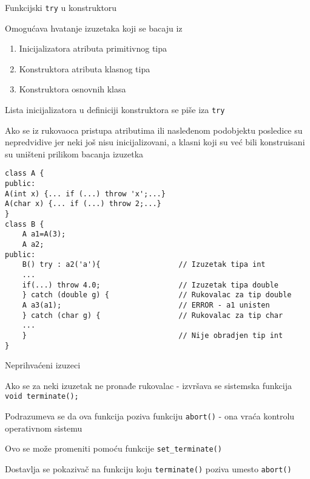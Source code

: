 \documentclass{article}
\newenvironment{xitemize}{%
    
    \itemize
    \larger
}{%
    \enditemize
}
\let\olditemize\itemize
\let\endolditemize\enditemize
\renewenvironment{itemize}{%
    \smaller
    \olditemize
}{%
    \endolditemize
}
\providecommand{\inlinecode}[1]{\texttt{#1}}
\begin{document}
\begin{xitemize}
\begin{itemize}
\begin{lstlisting}
    \end{lstlisting}
\end{itemize}
\item Funkcijski \inlinecode{try} u konstruktoru
\begin{itemize}
    \item Omogućava hvatanje izuzetaka koji se bacaju iz
    \begin{enumerate}
        \item Inicijalizatora atributa primitivnog tipa
        \item Konstruktora atributa klasnog tipa
        \item Konstruktora osnovnih klasa
    \end{enumerate}
    \item Lista inicijalizatora u definiciji konstruktora se piše iza \inlinecode{try}
    \item Ako se iz rukovaoca pristupa atributima ili nasleđenom podobjektu posledice su nepredvidive jer neki još nisu inicijalizovani, a klasni koji su već bili konstruisani su uništeni prilikom bacanja izuzetka
    \begin{lstlisting}
class A {
public:
A(int x) {... if (...) throw 'x';...}
A(char x) {... if (...) throw 2;...}
}
class B {
    A a1=A(3);
    A a2;
public:
    B() try : a2('a'){                  // Izuzetak tipa int
    ... 
    if(...) throw 4.0;                  // Izuzetak tipa double
    } catch (double g) {                // Rukovalac za tip double
    A a3(a1);                           // ERROR - a1 unisten
    } catch (char g) {                  // Rukovalac za tip char
    ...
    }                                   // Nije obradjen tip int
}
    \end{lstlisting}
\end{itemize}
\item Neprihvaćeni izuzeci
\begin{itemize}
    \item Ako se za neki izuzetak ne pronađe rukovalac - izvršava se sistemska funkcija \\
    \inlinecode{void terminate();}
    \item Podrazumeva se da ova funkcija poziva funkciju \inlinecode{abort()} - ona vraća kontrolu operativnom sistemu
    \item Ovo se može promeniti pomoću funkcije \inlinecode{set\_terminate()}
    \begin{itemize}
        \item Dostavlja se pokazivač na funkciju koju \inlinecode{terminate()} poziva umesto \inlinecode{abort()}

\end{itemize}
\end{itemize}
\end{xitemize}
\end{document}
